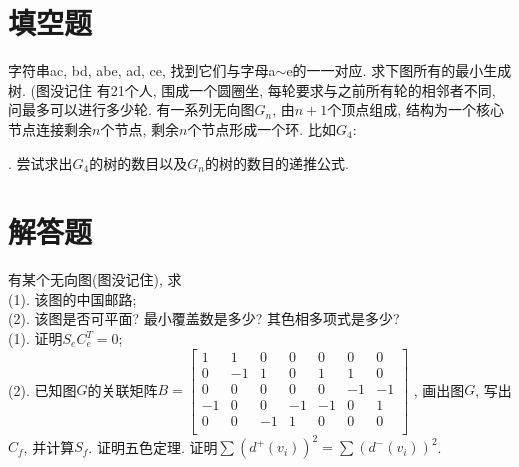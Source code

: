 \documentclass{exam}
\begin{document}
\part{填空题}
\begin{questions}
    \question 字符串ac, bd, abe, ad, ce, 找到它们与字母a$\sim$e的一一对应.
    \question 求下图所有的最小生成树. (图没记住
    \question 有21个人, 围成一个圆圈坐, 每轮要求与之前所有轮的相邻者不同, 问最多可以进行多少轮.
    \question 有一系列无向图$G_n$, 由$n+1$个顶点组成, 结构为一个核心节点连接剩余$n$个节点, 剩余$n$个节点形成一个环. 比如$G_4$: 
    . 尝试求出$G_4$的树的数目以及$G_n$的树的数目的递推公式.
\end{questions}
\part{解答题}
\begin{questions}
    \question 有某个无向图(图没记住), 求 \\
    (1). 该图的中国邮路; \\
    (2). 该图是否可平面? 最小覆盖数是多少? 其色相多项式是多少? \\
    \question (1). 证明$S_e C_e^T=0$; \\
    (2). 已知图$G$的关联矩阵$B=
    \begin{bmatrix}
        1 & 1 & 0 & 0 & 0 & 0 & 0 \\
        0 & -1 & 1 & 0 & 1 & 1 & 0 \\
        0 & 0 & 0 & 0 & 0 & -1 & -1 \\
        -1 & 0 & 0 & -1 & -1 & 0 & 1 \\
        0 & 0 & -1 & 1 & 0 & 0 & 0 \\
    \end{bmatrix}$
    , 画出图$G$, 写出$C_f$, 并计算$S_f$.
    \question 证明五色定理.
    \question 证明$\sum(d^+(v_i))^2=\sum(d^-(v_i))^2$.
\end{questions}
\end{document}
